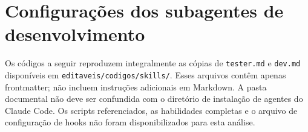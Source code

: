 \begingroup
\raggedbottom
\chapter{Configurações dos subagentes de desenvolvimento}
\label{apendice:agentes-ia}

Os códigos a seguir reproduzem integralmente as cópias de \texttt{tester.md} e \texttt{dev.md} disponíveis em \texttt{editaveis/codigos/skills/}. Esses arquivos contêm apenas frontmatter; não incluem instruções adicionais em Markdown. A pasta documental não deve ser confundida com o diretório de instalação de agentes do Claude Code. Os scripts referenciados, as habilidades completas e o arquivo de configuração de hooks não foram disponibilizados para esta análise.




\clearpage
\endgroup
